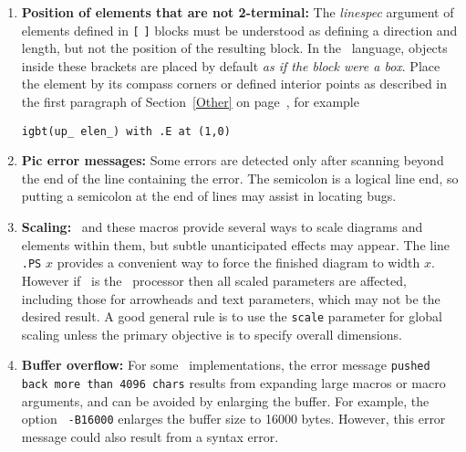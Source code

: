 \begin{enumerate}
{\tt resistor(up\_ from A to B); rlabel(,R\_1)}

\noindent%
rather than 

{\tt resistor(from A to B); rlabel(,R\_1),}

\noindent%
which produce different results if the last-defined drawing direction is not
{\tt up}.  It might be possible to change the label macros to avoid this problem
without sacrificing ease of use.

\item {\bf Position of elements that are not 2-terminal:}
  The {\sl linespec} argument of elements defined in {\tt[} {\tt]}
  blocks must be understood as defining a direction and length, but
  not the position of the resulting block.
  In the \pic\ language, objects inside these brackets are placed by
  default {\em as if the block were a box}.  Place the
  element by its compass corners or defined interior points
  as described in the first paragraph of Section~\ref{Other} on
  page~\pageref{Other}, for example  
  
{\tt igbt(up\_ elen\_) with .E at (1,0)}

\item {\bf Pic error messages:} Some errors are detected only after scanning
  beyond the end of the line containing the error.  The semicolon
  is a logical line end, so putting a semicolon at the end of lines may
  assist in locating bugs. 

\item {\bf Scaling:} \Pic\ and these macros provide several ways to scale
  diagrams and elements within them, but subtle unanticipated effects
  may appear.  The line {\tt.PS} $x$ provides a convenient way to force
  the finished diagram to width $x.$  However if \gpic\ is the
  \pic\ processor then all scaled parameters are affected, including those
  for arrowheads and text parameters, which may not be the desired
  result.  A good general rule is to use the {\tt scale} parameter for
  global scaling unless the primary objective is to specify overall
  dimensions.

\item {\bf Buffer overflow:} For some \Mfour\ implementations,
  the error message {\tt pushed back more than 4096 chars}
  results from expanding large macros or macro arguments, and can be
  avoided by enlarging the buffer.  For example, the option {\tt
  -B16000} enlarges the buffer size to 16000 bytes.  However, this
  error message could also result from a syntax error.


\end{enumerate}
